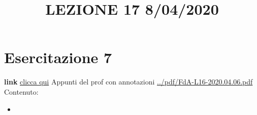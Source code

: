 \section{Esercitazione 7}
\title{LEZIONE 17 8/04/2020}\newline
\textbf{link} \href{https://web.microsoftstream.com/video/5d3f8bd1-ee8b-420b-802f-14dfed0bd278?list=user&userId=faa91214-a6f5-40d7-8875-253fd49b8ce1}{clicca qui}\newline
\newline
Appunti del prof con annotazioni \url{../pdf/FdA-L16-2020.04.06.pdf}\newline
Contenuto:
\begin{itemize}
    \item 
\end{itemize}